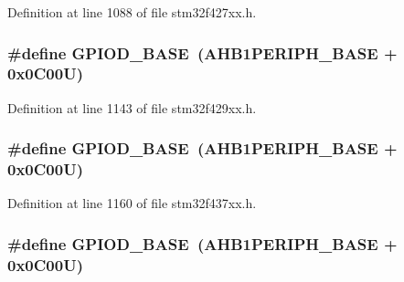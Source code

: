 Definition at line 1088 of file stm32f427xx.\+h.

\subsubsection[{\texorpdfstring{G\+P\+I\+O\+D\+\_\+\+B\+A\+SE}{GPIOD_BASE}}]{\setlength{\rightskip}{0pt plus 5cm}\#define G\+P\+I\+O\+D\+\_\+\+B\+A\+SE~({\bf A\+H\+B1\+P\+E\+R\+I\+P\+H\+\_\+\+B\+A\+SE} + 0x0\+C00\+U)}\hypertarget{group___peripheral__memory__map_ga1a93ab27129f04064089616910c296ec}{}\label{group___peripheral__memory__map_ga1a93ab27129f04064089616910c296ec}


Definition at line 1143 of file stm32f429xx.\+h.

\subsubsection[{\texorpdfstring{G\+P\+I\+O\+D\+\_\+\+B\+A\+SE}{GPIOD_BASE}}]{\setlength{\rightskip}{0pt plus 5cm}\#define G\+P\+I\+O\+D\+\_\+\+B\+A\+SE~({\bf A\+H\+B1\+P\+E\+R\+I\+P\+H\+\_\+\+B\+A\+SE} + 0x0\+C00\+U)}\hypertarget{group___peripheral__memory__map_ga1a93ab27129f04064089616910c296ec}{}\label{group___peripheral__memory__map_ga1a93ab27129f04064089616910c296ec}


Definition at line 1160 of file stm32f437xx.\+h.

\subsubsection[{\texorpdfstring{G\+P\+I\+O\+D\+\_\+\+B\+A\+SE}{GPIOD_BASE}}]{\setlength{\rightskip}{0pt plus 5cm}\#define G\+P\+I\+O\+D\+\_\+\+B\+A\+SE~({\bf A\+H\+B1\+P\+E\+R\+I\+P\+H\+\_\+\+B\+A\+SE} + 0x0\+C00\+U)}\hypertarget{group___peripheral__memory__map_ga1a93ab27129f04064089616910c296ec}{}\label{group___peripheral__memory__map_ga1a93ab27129f04064089616910c296ec}


